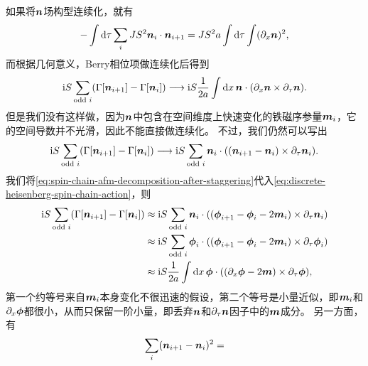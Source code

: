 如果将$\vb*{n}$场构型连续化，就有
\[
    - \int \dd{\tau} \sum_i JS^2 \vb*{n}_i \cdot \vb*{n}_{i+1} = JS^2 a \int \dd{\tau} \int (\partial_x {\vb*{n}})^2,
\]
而根据几何意义，Berry相位项做连续化后得到
\[
    {\mathrm{i} S} \sum_{\text{odd $i$}} (\Gamma[\vb*{n}_{i+1}] - \Gamma[\vb*{n}_i]) \longrightarrow \mathrm{i} S \frac{1}{2a} \int \dd{x} \vb*{n} \cdot (\partial_x \vb*{n} \times \partial_\tau \vb*{n}). 
\]
但是我们没有这样做，因为$\vb*{n}$中包含在空间维度上快速变化的铁磁序参量$\vb*{m}_i$，它的空间导数并不光滑，因此不能直接做连续化。
不过，我们仍然可以写出
\begin{equation}
    {\mathrm{i}S} \sum_{\text{odd $i$}} (\Gamma[\vb*{n}_{i+1}] - \Gamma[\vb*{n}_i]) \longrightarrow \mathrm{i} S \sum_\text{odd $i$} \vb*{n}_i \cdot ((\vb*{n}_{i+1} - \vb*{n}_i) \times \partial_\tau \vb*{n}_i). 
\end{equation}
我们将\eqref{eq:spin-chain-afm-decomposition-after-staggering}代入\eqref{eq:discrete-heisenberg-spin-chain-action}，则
\[
    \begin{aligned}
        \mathrm{i} S \sum_\text{odd $i$} (\Gamma[\vb*{n}_{i+1}] - \Gamma[\vb*{n}_i]) &\approx \mathrm{i} S \sum_\text{odd $i$} \vb*{n}_i \cdot ((\vb*{\phi}_{i+1} - \vb*{\phi}_i - 2 \vb*{m}_i) \times \partial_\tau \vb*{n}_i) \\
        &\approx \mathrm{i} S \sum_\text{odd $i$} \vb*{\phi}_i \cdot ((\vb*{\phi}_{i+1} - \vb*{\phi}_i - 2 \vb*{m}_i) \times \partial_\tau \vb*{\phi}_i) \\
        &\approx \mathrm{i} S \frac{1}{2a} \int \dd{x} \vb*{\phi} \cdot ((\partial_x \vb*{\phi} - 2 \vb*{m}) \times \partial_\tau \vb*{\phi}),
    \end{aligned}
\]
第一个约等号来自$\vb*{m}_i$本身变化不很迅速的假设，第二个等号是小量近似，即$\vb*{m}_i$和$\partial_x \vb*{\phi}$都很小，从而只保留一阶小量，即丢弃$\vb*{n}$和$\partial_\tau \vb*{n}$因子中的$\vb*{m}$成分。
另一方面，有
\[
    \sum_i (\vb*{n}_{i+1} - \vb*{n}_i)^2 = 
\]

